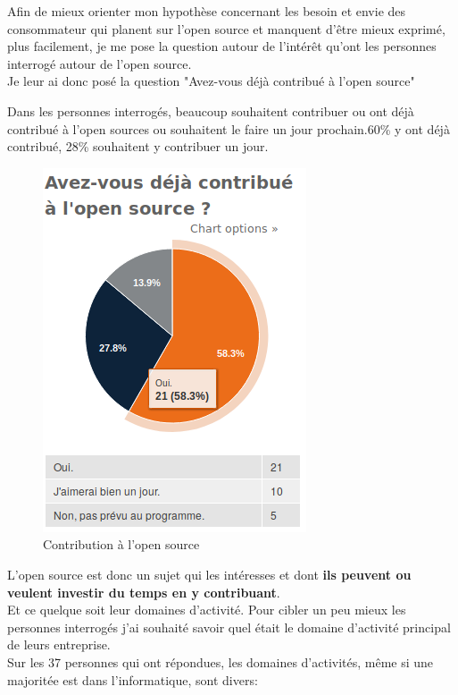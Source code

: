 			Afin de mieux orienter mon hypothèse concernant les besoin et envie des consommateur qui planent sur l'open source et manquent d'être mieux exprimé, plus facilement, je me pose la question autour de l'intérêt qu'ont les personnes interrogé autour de l'open source.\\

			Je leur ai donc posé la question "Avez-vous déjà contribué à l'open source"

			Dans les personnes interrogés, beaucoup souhaitent contribuer ou ont déjà contribué à l'open sources ou souhaitent le faire un jour prochain.60\% y ont déjà contribué, 28\% souhaitent y contribuer un jour.

			\begin{figure}[!htb]
				\center
				\includegraphics[scale=0.58]{./img/a4}
				\caption{Contribution à l'open source}
			\end{figure}

			L'open source est donc un sujet qui les intéresses et dont \textbf{ils peuvent ou veulent investir du temps en y contribuant}.\\

			Et ce quelque soit leur domaines d'activité. Pour cibler un peu mieux les personnes interrogés j'ai souhaité savoir quel était le domaine d'activité principal de leurs entreprise.\\

			Sur les 37 personnes qui ont répondues, les domaines d'activités, même si une majoritée est dans l'informatique, sont divers:

